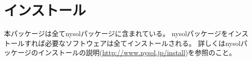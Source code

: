 
%

\section{インストール\label{sect:install}}

本パッケージは全てnysolパッケージに含まれている。 nysolパッケージをインストールすれば必要なソフトウェアは全てインストールされる。 
詳しくはnysolパッケージのインストールの説明(\url{http://www.nysol.jp/install})を参照のこと。
